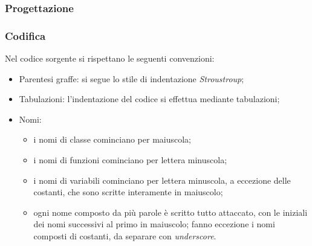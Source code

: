 \subsubsection{Progettazione}
\subsubsection{Codifica}
Nel codice sorgente si rispettano le seguenti convenzioni:
\begin{itemize}
	\item Parentesi graffe: si segue lo stile di indentazione \textit{Stroustroup};
	\item Tabulazioni: l'indentazione del codice si effettua mediante tabulazioni;
	\item Nomi: 
	\begin{itemize}
		\item i nomi di classe cominciano per maiuscola;
		\item i nomi di funzioni cominciano per lettera minuscola;
		\item i nomi di variabili cominciano per lettera minuscola, a eccezione delle costanti, che sono scritte interamente in maiuscolo;
		\item ogni nome composto da più parole è scritto tutto attaccato, con le iniziali dei nomi successivi al primo in maiuscolo; fanno 							eccezione i nomi composti di costanti, da separare con \textit{underscore}.
	\end{itemize}
\end{itemize}
